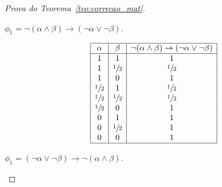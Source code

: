 \begin{proof}[Prova do Teorema~\ref{teo:correcao_mat}]
\begin{provaporcasos}
\begin{provaporsubcasos}
                \subcasodeprova{} $\phi_{1} = \neg(\alpha \land \beta) \to (\neg \alpha \lor \neg \beta)$. 

   
                \begin{center}
                    \[
                        \begin{array}{|c|c|c|}%
                            \hline%
                            \alpha      & \beta & \neg(\alpha \land \beta) \to (\neg \alpha \lor \neg \beta) \\
                            \hline%
                            1 & 1 & 1\\
                            1 & \meio{} & \meio{}\\
                            1 & 0 & 1\\
                            \meio{} & 1 & \meio{}\\
                            \meio{} & \meio{} &\meio{}\\ 
                            \meio{} & 0 & 1\\
                            0 & 1 & 1\\
                            0 & \meio{} & 1\\
                            0 & 0 & 1\\
                            \hline%
                        \end{array}
                    \]
                \end{center}
                
               

                \subcasodeprova{} $\phi_{1} = (\neg \alpha \lor \neg \beta) \to \neg (\alpha \land \beta)$. 
   

\end{provaporsubcasos}
\end{provaporcasos}
\end{proof}
